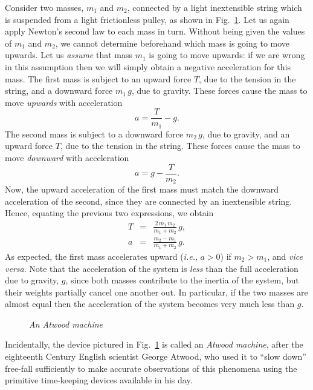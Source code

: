 Consider two masses, $m_1$ and $m_2$, connected by a light
inextensible string which is suspended from a light frictionless
pulley, as shown in Fig.~\ref{f31}. Let us again apply Newton's
second law to each mass in turn. Without being given the values
of $m_1$ and $m_2$, we cannot determine beforehand which mass is going to
move upwards. Let us  {\em assume} that mass $m_1$ is going to move upwards:
if we are wrong in this assumption then we will simply obtain a negative
acceleration for this mass. The first mass is subject to an
upward force $T$, due to the tension in the string, and a downward
force $m_1\,g$, due to gravity. These forces cause the mass to
move {\em upwards} with acceleration
\begin{equation}
a = \frac{T}{m_1} - g.
\end{equation}
The second mass is subject to a downward force $m_2\,g$, due to gravity,
and an upward force $T$, due to the tension in the string. These forces
cause the mass to move {\em downward} with acceleration
\begin{equation}
a = g - \frac{T}{m_2}.
\end{equation}
Now, the upward acceleration of the first mass must match the downward
acceleration of the second, since they are connected by an inextensible
string. Hence, equating the previous two expressions, we obtain
\begin{eqnarray}
T&=& \frac{2\,m_1\,m_2}{m_1+m_2}\,g,\\[0.5ex]
a &=& \frac{m_2-m_1}{m_1+m_2}\,g.
\end{eqnarray}
As expected, the first mass accelerates upward ({\em i.e.}, $a>0$) if $m_2>m_1$,
and {\em vice versa}. Note that the acceleration of the system is
{\em less} than the full acceleration due to gravity, $g$, since both masses
contribute to the inertia of the system, but their weights partially
cancel one another out. In particular, if the  two
masses are almost equal then the acceleration of the system becomes
very much less than $g$. 

\begin{figure}
\epsfysize=3.5in
\centerline{}
\caption{\em An Atwood machine}\label{f31}   
\end{figure}

Incidentally, the device pictured in Fig.~\ref{f31} is called an {\em Atwood machine},
after the eighteenth Century English scientist George Atwood, who used it
to ``slow down'' free-fall sufficiently to make accurate observations of this
phenomena using the primitive time-keeping devices available in his day.


